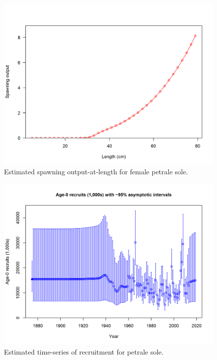 \documentclass[12pt,]{article}
\begin{document}
\begin{figure}
\centering
\includegraphics{r4ss/plots_mod1/bio10_spawningoutput_len.png}
\caption{Estimated spawning output-at-length for female petrale sole.
\label{fig:spawnoutlen}}
\end{figure}

\FloatBarrier 

\begin{figure}
\centering
\includegraphics{r4ss/plots_mod1/ts11_Age-0_recruits_(1000s)_with_95_asymptotic_intervals.png}
\caption{Estimated time-series of recruitment for petrale sole.
\label{fig:recruits}}
\end{figure}
\end{document}
